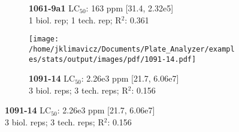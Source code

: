 \documentclass{article}
\begin{document}
\begin{figure}[thp!]
\begin{subfigure}{0.500\textwidth}
      \vspace{-0.05cm}
      \caption*{\textbf{1061-9a1} LC$_{50}$: 163 ppm [31.4, 2.32e5] \\ 
1 biol. rep; 1 tech. rep; R$^2$: 0.361}
      \vspace{0.1cm}
   \end{subfigure}%
   \begin{subfigure}{0.500\textwidth}
      \centering
      \texttt{[image: /home/jklimavicz/Documents/Plate\_Analyzer/examples/stats/output/images/pdf/1091-14.pdf]}
      \vspace{-0.05cm}
      \caption*{\textbf{1091-14} LC$_{50}$: 2.26e3 ppm [21.7, 6.06e7] \\ 
3 biol. reps; 3 tech. reps; R$^2$: 0.156}
      \vspace{0.1cm}
   \end{subfigure}%
\end{figure}
\clearpage
\pagebreak
\vspace{-0.1cm}
\end{document}
